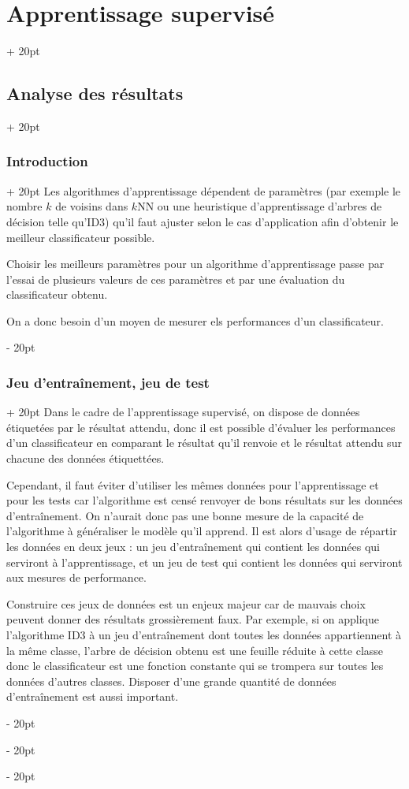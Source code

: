 \documentclass[a4paper, 12pt, twoside]{article}
\newcommand{\ind}[1][20pt]{\advance\leftskip + #1}
\newcommand{\deind}[1][20pt]{\advance\leftskip - #1}
\newenvironment{indt}[2][20pt]{#2 \par \ind[#1]}{\par \deind} %
\begin{document}
\begin{indt}{\section{Apprentissage supervisé}}
        \begin{indt}{\subsection{Analyse des résultats}}
            \begin{indt}{\subsubsection{Introduction}}
                Les algorithmes d'apprentissage dépendent de paramètres (par exemple le nombre $k$ de voisins dans $k$NN ou une heuristique d'apprentissage d'arbres de décision telle qu'ID3) qu'il faut ajuster selon le cas d'application afin d'obtenir le meilleur classificateur possible.

                Choisir les meilleurs paramètres pour un algorithme d'apprentissage passe par l'essai de plusieurs valeurs de ces paramètres et par une évaluation du classificateur obtenu.

                On a donc besoin d'un moyen de mesurer els performances d'un classificateur.
            \end{indt}

            \vspace{12pt}
            
            \begin{indt}{\subsubsection{Jeu d'entraînement, jeu de test}}
                Dans le cadre de l'apprentissage supervisé, on dispose de données étiquetées par le résultat attendu, donc il est possible d'évaluer les performances d'un classificateur en comparant le résultat qu'il renvoie et le résultat attendu sur chacune des données étiquettées.

                Cependant, il faut éviter d'utiliser les mêmes données pour l'apprentissage et pour les tests car l'algorithme est censé renvoyer de bons résultats sur les données d'entraînement. On n'aurait donc pas une bonne mesure de la capacité de l'algorithme à généraliser le modèle qu'il apprend.
                Il est alors d'usage de répartir les données en deux jeux : un jeu d'entraînement qui contient les données qui serviront à l'apprentissage, et un jeu de test qui contient les données qui serviront aux mesures de performance.

                Construire ces jeux de données est un enjeux majeur car de mauvais choix peuvent donner des résultats grossièrement faux. Par exemple, si on applique l'algorithme ID3 à un jeu d'entraînement dont toutes les données appartiennent à la même classe, l'arbre de décision obtenu est une feuille réduite à cette classe donc le classificateur est une fonction constante qui se trompera sur toutes les données d'autres classes.
                Disposer d'une grande quantité de données d'entraînement est aussi important.


\end{indt}
\end{indt}
\end{indt}
\end{document}

